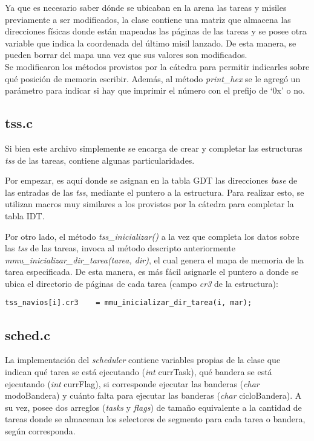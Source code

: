 \documentclass[a4paper]{article}
\newenvironment{codesnippet}{%
	\begin{Sbox}\begin{minipage}{\textwidth}\sffamily\small}%
	{\end{minipage}\end{Sbox}%
		\begin{center}%
		\vspace{-0.4cm}\colorbox{litegrey}{\TheSbox}\end{center}\vspace{0.3cm}}
\begin{document}
Ya que es necesario saber dónde se ubicaban en la arena las tareas y misiles previamente a ser modificados, la clase contiene una matriz que almacena las direcciones físicas donde están mapeadas las páginas de las tareas y se posee otra variable que indica la coordenada del último misil lanzado. De esta manera, se pueden borrar del mapa una vez que sus valores son modificados.
\\

Se modificaron los métodos provistos por la cátedra para permitir indicarles sobre qué posición de memoria escribir. Además, al método \textit{print_hex} se le agregó un parámetro para indicar si hay que imprimir el número con el prefijo de `0x' o no.

\subsection{tss.c}
Si bien este archivo simplemente se encarga de crear y completar las estructuras \textit{tss} de las tareas, contiene algunas particularidades.


Por empezar, es aquí donde se asignan en la tabla GDT las direcciones \textit{base} de las entradas de las \textit{tss}, mediante el puntero a la estructura. Para realizar esto, se utilizan macros muy similares a los provistos por la cátedra para completar la tabla IDT.


Por otro lado, el método \textit{tss_inicializar()} a la vez que completa los datos sobre las \textit{tss} de las tareas, invoca al método descripto anteriormente \textit{mmu_inicializar_dir_tarea(tarea, dir)}, el cual genera el mapa de memoria de la tarea especificada. De esta manera, es más fácil asignarle el puntero a donde se ubica el directorio de páginas de cada tarea (campo \textit{cr3} de la estructura):
\begin{codesnippet}
\begin{verbatim}
tss_navios[i].cr3    = mmu_inicializar_dir_tarea(i, mar);
\end{verbatim}
\end{codesnippet}

\subsection{sched.c}
La implementación del \textit{scheduler} contiene variables propias de la clase que indican qué tarea se está ejecutando (\textit{int} currTask), qué bandera se está ejecutando (\textit{int} currFlag), si corresponde ejecutar las banderas (\textit{char} modoBandera) y cuánto falta para ejecutar las banderas (\textit{char} cicloBandera). A su vez, posee dos arreglos (\textit{tasks} y \textit{flags}) de tamaño equivalente a la cantidad de tareas donde se almacenan los selectores de segmento para cada tarea o bandera, según corresponda.
\\
\end{document}
